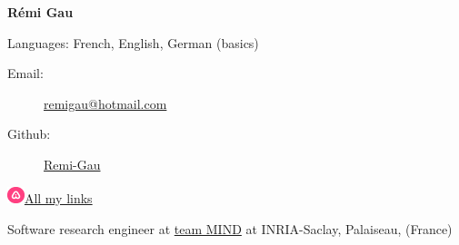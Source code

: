 \documentclass[a4paper,12pt,oneside]{letter}
\date{2021-04-10}
\begin{document}
\textbf{{\LARGE Rémi Gau}}

Languages: French, English, German (basics)

\doubleline

\begin{minipage}{.49\textwidth}
\begin{description}
    \item[Email:]
        \href{mailto:remi\textunderscore gau@hotmail.com}
            {remi\textunderscore gau@hotmail.com}
    \item[Github:]
        \href{https://github.com/Remi-Gau}{Remi-Gau}
\end{description}
\end{minipage}

\begin{minipage}{.49\textwidth}
\begin{description}
    \item[\href{https://allmylinks.com/remi-gau}
                {\includegraphics[width=0.5cm]{./images/allmylinks.png}All my links}]
\end{description}
\end{minipage}

\vspace{10pt}

\doubleline


{



Software research engineer at \href{https://www.inria.fr/en/mind}{team MIND}
at INRIA-Saclay, Palaiseau, (France)
























% 

}
\end{document}
